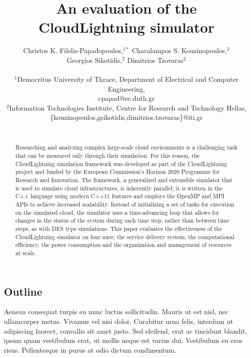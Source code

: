 \documentclass[12pt]{article}
\title{An evaluation of the CloudLightning simulator}
\author
{Christos K. Filelis-Papadopoulos,$^{1\ast}$ Charalampos S. Kouzinopoulos,$^{2}$\\
Georgios Sikotidis,$^{2}$ Dimitrios Tzovaras$^{2}$\\
\\
\normalsize{$^{1}$Democritus University of Thrace, Department of Electrical and Computer Engineering,}\\
\normalsize{cpapad@ee.duth.gr}\\
\normalsize{$^{2}$Information Technologies Institute, Centre for Research and Technology Hellas,}\\
\normalsize{\{kouzinopoulos,gsikotidis,dimitrios.tzovaras\}@iti.gr}\\
\\
}
\date{}
\begin{document}
\baselineskip24pt


\maketitle


\begin{abstract}
Researching and analyzing complex large-scale cloud environments is a challenging task that can be measured only through their simulation. For this reason, the CloudLightning simulation framework was developed as part of the CloudLightning project and funded by the European Commission’s Horizon 2020 Programme for Research and Innovation. The framework, a generalized and extensible simulator that is used to simulate cloud infrastructures, is inherently parallel; it is written in the C++ language using modern C++11 features and employs the OpenMP and MPI APIs to achieve increased scalability. Instead of initializing a set of tasks for execution on the simulated cloud, the simulator uses a time-advancing loop that allows for changes in the status of the system during each time step, rather than between time steps, as with DES type simulations. This paper evaluates the effectiveness of the CloudLightning simulator on four axes; the service delivery system, the computational efficiency, the power consumption and the organization and management of resources at scale.
\end{abstract}














\subsection{Outline}

Aenean consequat turpis eu nunc luctus sollicitudin. Mauris ut est nisl, nec ullamcorper metus. Vivamus vel nisi dolor. Curabitur urna felis, interdum ut adipiscing laoreet, convallis sit amet justo. Sed eleifend, erat ac tincidunt blandit, ipsum quam vestibulum erat, ut mollis neque est varius dui. Vestibulum eu eros risus. Pellentesque in purus at odio dictum condimentum.
\end{document}
